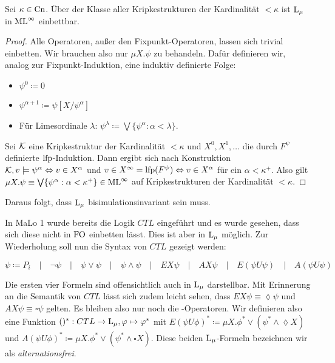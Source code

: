 \begin{satz}
	Sei $\kappa\in \operatorname{Cn}$. Über der Klasse aller Kripkestrukturen der Kardinalität $< \kappa$ ist $\operatorname{L}_\mu$ in $\operatorname{ML}^\infty$ einbettbar.
\end{satz}
\begin{proof}
	Alle Operatoren, außer den Fixpunkt-Operatoren, lassen sich trivial einbetten. Wir brauchen also nur $\mu X .\psi$ zu behandeln. Dafür definieren wir, analog zur Fixpunkt-Induktion, eine induktiv definierte Folge:
	\begin{itemize}
		\item $\psi^0\coloneqq 0$
		\item $\psi^{\alpha+1} \coloneqq \psi[X/\psi^\alpha]$
		\item Für Limesordinale $\lambda$: $\psi^\lambda\coloneqq \bigvee\{\psi^\alpha : \alpha < \lambda\}$.
	\end{itemize}
	Sei $\mathcal{K}$ eine Kripkestruktur der Kardinalität $<\kappa$ und $X^0,X^1,\dots$ die durch $F^\psi$ definierte $\operatorname{lfp}$-Induktion. Dann ergibt sich nach Konstruktion $\mathcal{K},v\models \psi^\alpha \Leftrightarrow v\in X^\alpha$ und $v\in X^\infty=\operatorname{lfp}(F^\psi)\Leftrightarrow v\in X^\alpha$ für ein $\alpha<\kappa^+$. Also gilt $\mu X.\psi \equiv \bigvee\{\psi^\alpha : \alpha < \kappa^+\}\in \operatorname{ML}^\infty$ auf Kripkestrukturen der Kardinalität $<\kappa$.
\end{proof}

Daraus folgt, dass $\operatorname{L}_\mu$ bisimulationsinvariant sein muss.

In MaLo 1 wurde bereits die Logik $CTL$ eingeführt und es wurde gesehen, dass sich diese nicht in $\operatorname{FO}$ einbetten lässt. Dies ist aber in $\operatorname{L}_\mu$ möglich. Zur Wiederholung soll nun die Syntax von $CTL$ gezeigt werden:

\[\psi \coloneqq P_i \quad\vert\quad \neg\psi \quad\vert\quad \psi \lor \psi \quad\vert\quad \psi\land\psi \quad\vert\quad EX\psi \quad\vert\quad AX\psi \quad\vert\quad E(\psi U \psi) \quad\vert\quad A(\psi U \psi)\]

Die ersten vier Formeln sind offensichtlich auch in $\operatorname{L}_\mu$ darstellbar. Mit Erinnerung an die Semantik von $CTL$ lässt sich zudem leicht sehen, dass $EX\psi \equiv \lozenge\psi$ und $AX\psi \equiv \square\psi$ gelten. Es bleiben also nur noch die -Operatoren. Wir definieren also eine Funktion $()^\ast: CTL\to \operatorname{L}_\mu, \varphi\mapsto \varphi^\ast$ mit $E(\psi U \phi)^\ast \coloneqq \mu X . \phi^\ast \lor (\psi^\ast \land \lozenge X)$ und $A(\psi U \phi)^\ast \coloneqq \mu X . \phi^\ast \lor (\psi^\ast \land \square X)$. Diese beiden $\operatorname{L}_\mu$-Formeln bezeichnen wir als \textit{alternationsfrei}.

